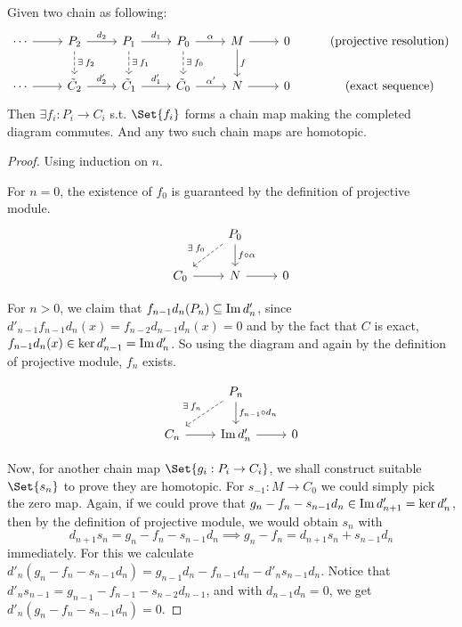 \begin{theorem} \label{thm:comparison-theorem}
  Given two chain as following:
  \[
    \begin{tikzcd}
      \dotsm \ar[r] & P_2 \ar[r, "d_2"] \ar[d, dashed, "\exists f_2"]
                    & P_1 \ar[r, "d_1"] \ar[d, dashed, "\exists f_1"]
                    & P_0 \ar[r, "\alpha"] \ar[d, dashed, "\exists f_0"]
                    & M \ar[r] \ar[d, "f"] & 0
                    & \text{(projective resolution)} \\
      \dotsm \ar[r] & \tilde C_2 \ar[r, "d_2'"]
                    & \tilde C_1 \ar[r, "d_1'"]
                    & \tilde C_0 \ar[r, "\alpha'"]
                    & N \ar[r] & 0
                    & \text{(exact sequence)}
    \end{tikzcd}
  \]
  Then $\exists f_i : P_i \to C_i$ s.t. $\Set{f_i}$ forms a chain map making the
  completed diagram commutes. And any two such chain maps are homotopic.
  \begin{proof}
    Using induction on $n$.

    For $n = 0$, the existence of $f_0$ is guaranteed by the definition of projective module.
    \[ \begin{tikzcd}
        & P_0 \ar[d, "f \circ \alpha"] \ar[ld, dashed, "\exists f_0"'] & \\
        C_0 \ar[r] & N \ar[r] & 0
    \end{tikzcd} \]

    For $n > 0$, we claim that $f_{n-1} d_n (P_n) \subseteq \operatorname{Im} d'_{n}$,
    since $d'_{n-1} f_{n-1} d_n (x) = f_{n-2} d_{n-1} d_n (x) = 0$ and
    by the fact that $C$ is exact, $f_{n-1} d_n (x) \in \ker d'_{n-1} = \operatorname{Im} d'_n$.
    So using the diagram and again by the definition of projective module,
    $f_n$ exists.

    \[ \begin{tikzcd}
        & P_n \ar[d, "f_{n-1} \circ d_n"] \ar[ld, dashed, "\exists f_n"'] & \\
        C_n \ar[r] & \Image d'_n \ar[r] & 0
    \end{tikzcd} \]

    Now, for another chain map $\Set{g_i: P_i \to C_i}$, we shall construct suitable $\Set{s_n}$
    to prove they are homotopic. For $s_{-1} : M \to C_0$ we could simply pick the
    zero map. Again, if we could prove that
    $g_n - f_n - s_{n-1} d_n \in \operatorname{Im} d'_{n+1} = \ker d'_n$, then by
    the definition of projective module, we would obtain $s_n$ with
    \[ d_{n+1} s_n = g_n - f_n - s_{n-1} d_n \implies g_n - f_n = d_{n+1} s_n + s_{n-1} d_n \]
    immediately. For this we calculate $d'_n (g_n - f_n - s_{n-1} d_n)
    = g_{n-1} d_n - f_{n-1} d_n - d'_n s_{n-1} d_n$. Notice that
    $d'_n s_{n-1} = g_{n-1} - f_{n-1} - s_{n-2} d_{n-1}$, and
    with $d_{n-1} d_n = 0$, we get $d'_n (g_n - f_n - s_{n-1} d_n) = 0$.
  \end{proof}
\end{theorem}

